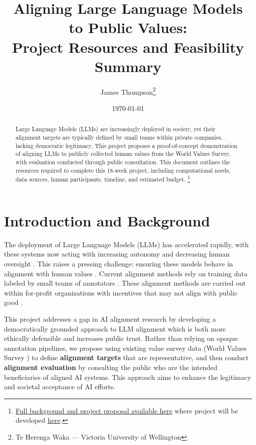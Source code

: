 \documentclass[11pt, a4paper]{article}
\title{Aligning Large Language Models to Public Values:\\Project Resources and Feasibility Summary}
\author{James Thompson\thanks{Te Herenga Waka — Victoria University of Wellington}}
\date{\today}
\newcommand{\term}[1]{\textbf{#1}}
\begin{document}
\maketitle

\begin{abstract}
	Large Language Models (LLMs) are increasingly deployed in society, yet their alignment targets are typically defined by small teams within private companies, lacking democratic legitimacy. This project proposes a proof-of-concept demonstration of aligning LLMs to publicly collected human values from the World Values Survey, with evaluation conducted through public consultation. This document outlines the resources required to complete this 18-week project, including computational needs, data sources, human participants, timeline, and estimated budget. \footnote{\href{https://raw.githubusercontent.com/1jamesthompson1/AIML501/main/output/AIML501_James_Thompson.pdf}{Full background and project proposal available here} where project will be developed \href{https://github.com/1jamesthompson1/AIML589}{here}.}


\end{abstract}

\section{Introduction and Background}

The deployment of Large Language Models (LLMs) has accelerated rapidly, with these systems now acting with increasing autonomy and decreasing human oversight \cite{bommasaniOpportunitiesRisksFoundation2022}. This raises a pressing challenge: ensuring these models behave in alignment with human values \cite{amodeiConcreteProblemsAI2016a,hendrycksUnsolvedProblemsML2022,bostromEthicsArtificialIntelligence2014}. Current alignment methods rely on training data labeled by small teams of annotators \cite{baiTrainingHelpfulHarmless2022,ouyangTrainingLanguageModels2022}. These alignment methods are carried out within for-profit organizations with incentives that may not align with public good \cite{r.h.coarseProblemSocialCost,hendrycksAligningAIShared2023}.

This project addresses a gap in AI alignment research by developing a democratically grounded approach to LLM alignment which is both more ethically defensible and increases public trust. Rather than relying on opaque annotation pipelines, we propose using existing value survey data (World Values Survey \cite{WVS2020}) to define \term{alignment targets} that are representative, and then conduct \term{alignment evaluation} by consulting the public who are the intended beneficiaries of aligned AI systems. This approach aims to enhance the legitimacy and societal acceptance of AI efforts.
\end{document}
